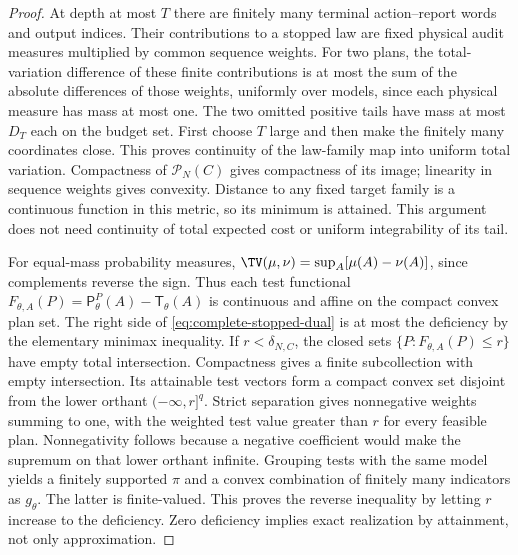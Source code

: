 \begin{proof}
At depth at most $T$ there are finitely many terminal action--report words and output indices. Their contributions to a stopped law are fixed physical audit measures multiplied by common sequence weights. For two plans, the total-variation difference of these finite contributions is at most the sum of the absolute differences of those weights, uniformly over models, since each physical measure has mass at most one. The two omitted positive tails have mass at most $D_T$ each on the budget set. First choose $T$ large and then make the finitely many coordinates close. This proves continuity of the law-family map into uniform total variation. Compactness of $\mathcal P_N(C)$ gives compactness of its image; linearity in sequence weights gives convexity. Distance to any fixed target family is a continuous function in this metric, so its minimum is attained. This argument does not need continuity of total expected cost or uniform integrability of its tail.

For equal-mass probability measures, $\TV(\mu,\nu)=\sup_A[\mu(A)-\nu(A)]$, since complements reverse the sign. Thus each test functional
$F_{\theta,A}(P)=\mathsf P_\theta^P(A)-\mathsf T_\theta(A)$ is continuous and affine on the compact convex plan set. The right side of \eqref{eq:complete-stopped-dual} is at most the deficiency by the elementary minimax inequality. If $r<\delta_{N,C}$, the closed sets $\{P:F_{\theta,A}(P)\le r\}$ have empty total intersection. Compactness gives a finite subcollection with empty intersection. Its attainable test vectors form a compact convex set disjoint from the lower orthant $(-\infty,r]^q$. Strict separation gives nonnegative weights summing to one, with the weighted test value greater than $r$ for every feasible plan. Nonnegativity follows because a negative coefficient would make the supremum on that lower orthant infinite. Grouping tests with the same model yields a finitely supported $\pi$ and a convex combination of finitely many indicators as $g_\theta$. The latter is finite-valued. This proves the reverse inequality by letting $r$ increase to the deficiency. Zero deficiency implies exact realization by attainment, not only approximation.


\end{proof}
